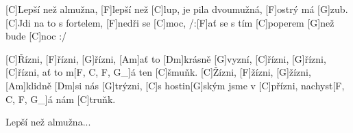 
[C]Lepší než almužna, [F]lepší než [C]lup,
je pila dvoumužná, [F]ostrý má [G]zub.
[C]Jdi na to s fortelem, [F]nedři se [C]moc,
/:[F]ať se s tím [C]poperem
[G]než bude [C]noc :/

[C]\null Řízni, [F]\null řízni, [G]\null řízni,
[Am]ať to [Dm]krásně [G]vyzní,
[C]\null řízni, [G]\null řízni, [C]\null řízni,
ať to m[F, C, F, G_]\null á ten [C]\null šmuňk.
[C]\null Žízni, [F]\null žízni, [G]\null žízni,
[Am]klidně [Dm]si nás [G]trýzni,
[C]\null s hostin[G]ským jsme v [C]\null přízni,
nachyst[F, C, F, G_]\null á nám [C]\null truňk.

Lepší než almužna...
\vfill
